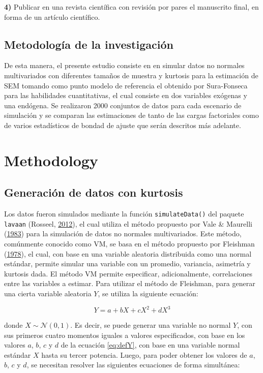 \documentclass[
  english]{revcoles}
\begin{document}
\textbf{4)} Publicar en una revista científica con revisión por pares el
manuscrito final, en forma de un artículo científico.

\subsection{Metodología de la investigación}

De esta manera, el presente estudio consiste en en simular datos no
normales multivariados con diferentes tamaños de muestra y kurtosis para
la estimación de SEM tomando como punto modelo de referencia el obtenido
por Sura-Fonseca para las habilidades cuantitativas, el cual consiste en
dos variables exógenas y una endógena. Se realizaron 2000 conjuntos de
datos para cada escenario de simulación y se comparan las estimaciones
de tanto de las cargas factoriales como de varios estadísticos de bondad
de ajuste que serán descritos más adelante.

\section{Methodology}

\subsection{Generación de datos con kurtosis}

Los datos fueron simulados mediante la función \texttt{simulateData()}
del paquete \texttt{lavaan} (Rosseel,
\protect\hyperlink{ref-lavaan}{2012}), el cual utiliza el método
propuesto por Vale \& Maurelli (\protect\hyperlink{ref-Vale1983}{1983})
para la simulación de datos no normales multivariados. Este método,
comúnmente conocido como VM, se basa en el método propuesto por
Fleishman (\protect\hyperlink{ref-Fleishman1978}{1978}), el cual, con
base en una variable aleatoria distribuida como una normal estándar,
permite simular una variable con un promedio, variancia, asimetría y
kurtosis dada. El método VM permite especificar, adicionalmente,
correlaciones entre las variables a estimar. Para utilizar el método de
Fleishman, para generar una cierta variable aleatoria \(Y\), se utiliza
la siguiente ecuación:

\begin{equation} \label{eq:defY}
  Y = a + bX + cX^2 + d X^3
\end{equation}

donde \(X \sim \mathcal{N} (0,1)\). Es decir, se puede generar una
variable no normal \(Y\), con sus primeros cuatro momentos iguales a
valores especificados, con base en los valores \(a\), \(b\), \(c\) y
\(d\) de la ecuación \ref{eq:defY}, con base en una variable normal
estándar \(X\) hasta su tercer potencia. Luego, para poder obtener los
valores de \(a\), \(b\), \(c\) y \(d\), se necesitan resolver las
siguientes ecuaciones de forma simultánea:
\end{document}
